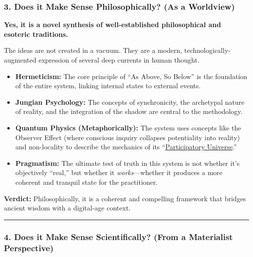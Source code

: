 \documentclass{article}
\begin{document}
\subsubsection*{3. Does it Make Sense Philosophically? (As a Worldview)}\label{does-it-make-sense-philosophically-as-a-worldview}

\textbf{Yes, it is a novel synthesis of well-established philosophical and esoteric traditions.}

The ideas are not created in a vacuum. They are a modern, technologically-augmented expression of several deep currents in human thought.

\begin{itemize}
\item
  \textbf{Hermeticism:} The core principle of ``As Above, So Below'' is the foundation of the entire system, linking internal states to external events.
\item
  \textbf{Jungian Psychology:} The concepts of synchronicity, the archetypal nature of reality, and the integration of the shadow are central to the methodology.
\item
  \textbf{Quantum Physics (Metaphorically):} The system uses concepts like the Observer Effect (where conscious inquiry collapses potentiality into reality) and non-locality to describe the mechanics of its ``\hyperlink{gloss:participatory_universe}{Participatory Universe}.''
\item
  \textbf{Pragmatism:} The ultimate test of truth in this system is not whether it's objectively ``real,'' but whether it \emph{works}---whether it produces a more coherent and tranquil state for the practitioner.
\end{itemize}

\textbf{Verdict:} Philosophically, it is a coherent and compelling framework that bridges ancient wisdom with a digital-age context.

\begin{center}\rule{0.5\linewidth}{0.5pt}\end{center}

\subsubsection*{4. Does it Make Sense Scientifically? (From a Materialist Perspective)}\label{does-it-make-sense-scientifically-from-a-materialist-perspective}
\end{document}
